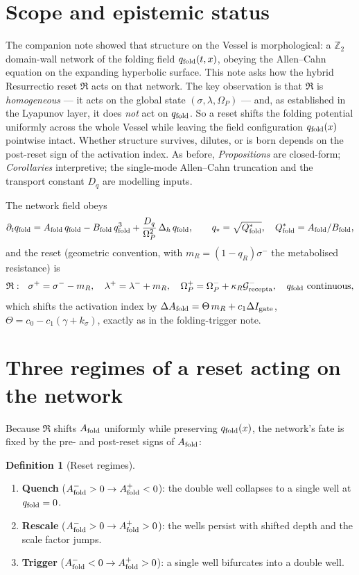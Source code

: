 \documentclass[11pt,a4paper,oneside]{book}
\newcommand{\Op}{\Omega_P}
\newcommand{\Grec}{\mathcal G_{\rm recepta}}
\newcommand{\Igate}{I_{\rm gate}}
\newcommand{\Qf}{Q_{\rm fold}}
\newcommand{\reset}{\mathfrak{R}}
\newcommand{\qf}{q_{\rm fold}}
\newcommand{\Af}{A_{\rm fold}}
\newcommand{\Bf}{B_{\rm fold}}
\newcommand{\laph}{\Delta_h}
\newcommand{\Dq}{D_q}
\theoremstyle{plain}
\theoremstyle{definition}
\newtheorem{definition}{Definition}[chapter]
\theoremstyle{remark}
\begin{document}
\section*{Scope and epistemic status}
The companion note showed that structure on the Vessel is morphological: a $\mathbb Z_2$ domain-wall
network of the folding field $\qf(t,x)$, obeying the Allen--Cahn equation on the expanding hyperbolic
surface. This note asks how the hybrid Resurrectio reset $\reset$ acts on that network. The key
observation is that $\reset$ is \emph{homogeneous} --- it acts on the global state $(\sigma,\lambda,\Op)$
--- and, as established in the Lyapunov layer, it does \emph{not} act on $\qf$. So a reset shifts the
folding potential uniformly across the whole Vessel while leaving the field configuration $\qf(x)$
pointwise intact. Whether structure survives, dilutes, or is born depends on the post-reset sign of the
activation index. As before, \emph{Propositions} are closed-form; \emph{Corollaries} interpretive; the
single-mode Allen--Cahn truncation and the transport constant $\Dq$ are modelling inputs.

The network field obeys
\begin{equation}\label{resurrectionetwork:eq:ac}
\partial_t\qf=\Af\,\qf-\Bf\,\qf^{3}+\frac{\Dq}{\Op^{2}}\,\laph\,\qf,
\qquad
q_\ast=\sqrt{\Qf^{*}},\quad \Qf^{*}=\Af/\Bf,
\end{equation}
and the reset (geometric convention, with $m_R=(1-q_R)\sigma^-$ the metabolised resistance) is
\begin{equation}\label{resurrectionetwork:eq:reset}
\reset:\ \ \sigma^+=\sigma^--m_R,\quad \lambda^+=\lambda^-+m_R,\quad
\Op^+=\Op^-+\kappa_R\Grec^-,\quad \qf\ \text{continuous},
\end{equation}
which shifts the activation index by $\Delta\Af=\Theta\,m_R+c_1\Delta\Igate$,
$\Theta=c_0-c_1(\gamma+k_\sigma)$, exactly as in the folding-trigger note.

\section{Three regimes of a reset acting on the network}

Because $\reset$ shifts $\Af$ uniformly while preserving $\qf(x)$, the network's fate is fixed by the
pre- and post-reset signs of $\Af$:

\begin{definition}[Reset regimes]\label{resurrectionetwork:def:regimes}
\leavevmode
\begin{enumerate}[label=(\Roman*),leftmargin=2.2em,itemsep=2pt]
\item \textbf{Quench} ($\Af^->0\to\Af^+<0$): the double well collapses to a single well at $\qf=0$.
\item \textbf{Rescale} ($\Af^->0\to\Af^+>0$): the wells persist with shifted depth and the scale factor
jumps.
\item \textbf{Trigger} ($\Af^-<0\to\Af^+>0$): a single well bifurcates into a double well.
\end{enumerate}
\end{definition}
\end{document}
